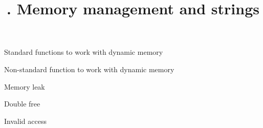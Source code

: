 

\title{. Memory management and strings}






\frame{\titlepage}
\begin{frame}{Standard functions to work with dynamic memory}
    
\end{frame}
\begin{frame}{Non-standard function to work with dynamic memory}
    
\end{frame}
\begin{frame}{Memory leak}
    
\end{frame}
\begin{frame}{Double free}
    
\end{frame}
\begin{frame}{Invalid access}
    
\end{frame}
